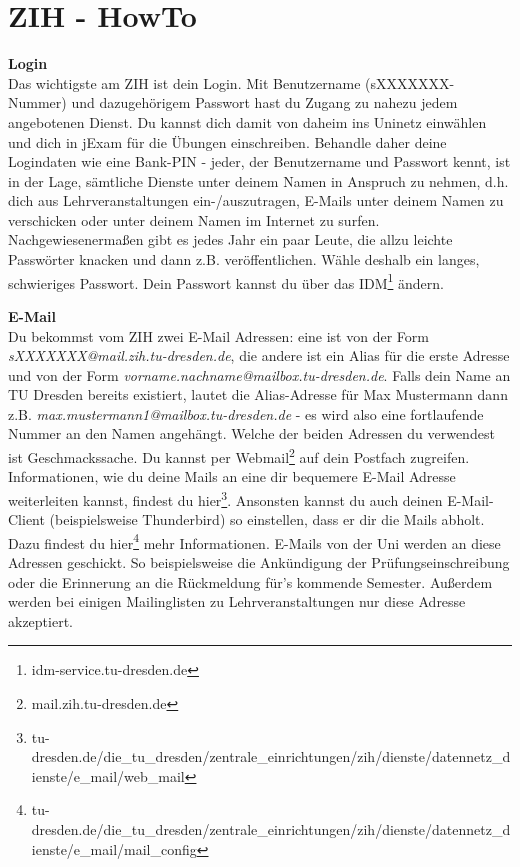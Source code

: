 \section{ZIH - HowTo}


\textbf{Login} \\
Das wichtigste am ZIH ist dein Login.
Mit Benutzername (sXXXXXXX-Nummer) und dazugehörigem Passwort hast du Zugang zu nahezu jedem angebotenen Dienst.
Du kannst dich damit von daheim ins Uninetz einwählen und dich in jExam für die Übungen einschreiben.
Behandle daher deine Logindaten wie eine Bank-PIN - jeder, der Benutzername und Passwort kennt, ist in der Lage, sämtliche Dienste unter deinem Namen in Anspruch zu nehmen, d.h. dich aus Lehrveranstaltungen ein-/auszutragen, E-Mails unter deinem Namen zu verschicken oder unter deinem Namen im Internet zu surfen.
Nachgewiesenermaßen gibt es jedes Jahr ein paar Leute, die allzu leichte Passwörter knacken und dann z.B. veröffentlichen.
Wähle deshalb ein langes, schwieriges Passwort. Dein Passwort kannst du über das IDM\footnote{idm-service.tu-dresden.de} ändern.

\textbf{E-Mail} \\
Du bekommst vom ZIH zwei E-Mail Adressen:
eine ist von der Form \textit{sXXXXXXX@mail.zih.tu-dresden.de}, die andere ist ein Alias für die erste Adresse und von der Form \textit{vorname.nachname@mailbox.tu-dresden.de}.
Falls dein Name an TU Dresden bereits existiert, lautet die Alias-Adresse für Max Mustermann dann z.B. \textit{max.mustermann1@mailbox.tu-dresden.de} - es wird also eine fortlaufende Nummer an den Namen angehängt.
Welche der beiden Adressen du verwendest ist Geschmackssache.
Du kannst per Webmail\footnote{mail.zih.tu-dresden.de} auf dein Postfach zugreifen.
Informationen, wie du deine Mails an eine dir bequemere E-Mail Adresse weiterleiten kannst, findest du hier\footnote{tu-dresden.de/die\_tu\_dresden/zentrale\_einrichtungen/zih/dienste/datennetz\_dienste/e\_mail/web\_mail}.
Ansonsten kannst du auch deinen E-Mail-Client (beispielsweise Thunderbird) so einstellen, dass er dir die Mails abholt.
Dazu findest du hier\footnote{tu-dresden.de/die\_tu\_dresden/zentrale\_einrichtungen/zih/dienste/datennetz\_dienste/e\_mail/mail\_config} mehr Informationen.
E-Mails von der Uni werden an diese Adressen geschickt.
So beispielsweise die Ankündigung der Prüfungseinschreibung oder die Erinnerung an die Rückmeldung für's kommende Semester.
Außerdem werden bei einigen Mailinglisten zu Lehrveranstaltungen nur diese Adresse akzeptiert.

